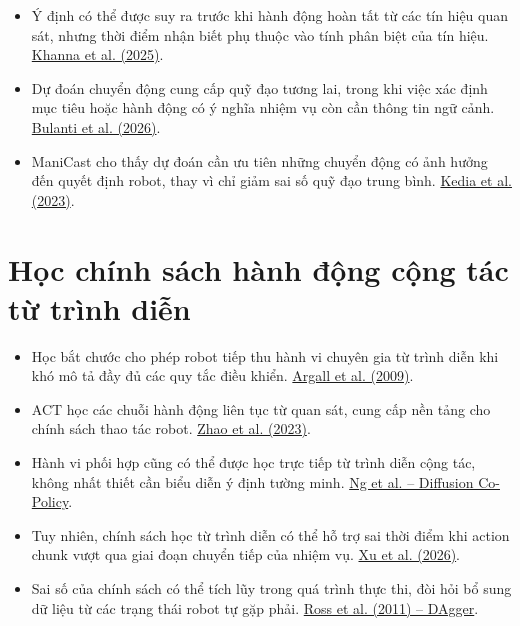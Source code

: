 \begin{itemize}
    \item Ý định có thể được suy ra trước khi hành động hoàn tất từ các tín hiệu quan sát, nhưng thời điểm nhận biết phụ thuộc vào tính phân biệt của tín hiệu.
    \href{https://arxiv.org/abs/2502.11752}{Khanna et al. (2025)}.

    \item Dự đoán chuyển động cung cấp quỹ đạo tương lai, trong khi việc xác định mục tiêu hoặc hành động có ý nghĩa nhiệm vụ còn cần thông tin ngữ cảnh.
    \href{https://arxiv.org/abs/2604.03065}{Bulanti et al. (2026)}.

    \item ManiCast cho thấy dự đoán cần ưu tiên những chuyển động có ảnh hưởng đến quyết định robot, thay vì chỉ giảm sai số quỹ đạo trung bình.
    \href{https://proceedings.mlr.press/v229/kedia23a.html}{Kedia et al. (2023)}.
\end{itemize}


\section{Học chính sách hành động cộng tác từ trình diễn}

\begin{itemize}
    \item Học bắt chước cho phép robot tiếp thu hành vi chuyên gia từ trình diễn khi khó mô tả đầy đủ các quy tắc điều khiển.
    \href{https://doi.org/10.1016/j.robot.2008.10.024}{Argall et al. (2009)}.

    \item ACT học các chuỗi hành động liên tục từ quan sát, cung cấp nền tảng cho chính sách thao tác robot.
    \href{https://roboticsproceedings.org/rss19/p016.html}{Zhao et al. (2023)}.

    \item Hành vi phối hợp cũng có thể được học trực tiếp từ trình diễn cộng tác, không nhất thiết cần biểu diễn ý định tường minh.
    \href{https://arxiv.org/abs/2305.12171}{Ng et al. -- Diffusion Co-Policy}.

    \item Tuy nhiên, chính sách học từ trình diễn có thể hỗ trợ sai thời điểm khi action chunk vượt qua giai đoạn chuyển tiếp của nhiệm vụ.
    \href{https://arxiv.org/abs/2606.12475}{Xu et al. (2026)}.

    \item Sai số của chính sách có thể tích lũy trong quá trình thực thi, đòi hỏi bổ sung dữ liệu từ các trạng thái robot tự gặp phải.
    \href{https://proceedings.mlr.press/v15/ross11a.html}{Ross et al. (2011) -- DAgger}.
\end{itemize}


